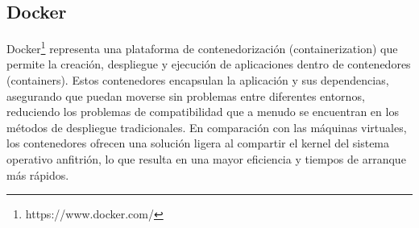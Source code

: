 \subsection{Docker}

Docker\footnote{https://www.docker.com/} representa una plataforma de contenedorización (containerization) que permite la creación, despliegue y ejecución de aplicaciones 
dentro de contenedores (containers). Estos contenedores encapsulan la aplicación y sus dependencias, asegurando que puedan moverse 
sin problemas entre diferentes entornos, reduciendo los problemas de compatibilidad que a menudo se encuentran en los métodos de despliegue 
tradicionales. En comparación con las máquinas virtuales, los contenedores ofrecen una 
solución ligera al compartir el kernel del sistema operativo anfitrión, lo que resulta en una mayor eficiencia y 
tiempos de arranque más rápidos. 